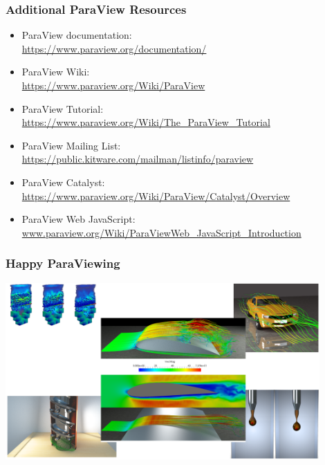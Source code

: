 \begin{frame}

  \frametitle{Additional ParaView Resources}

  \begin{itemize}
      \item ParaView documentation:\\
        \url{https://www.paraview.org/documentation/}
      \item ParaView Wiki:\\
        \url{https://www.paraview.org/Wiki/ParaView}
      \item ParaView Tutorial:\\
        \url{https://www.paraview.org/Wiki/The\_ParaView\_Tutorial}
      \item ParaView Mailing List:\\
        \url{https://public.kitware.com/mailman/listinfo/paraview}
      \item ParaView Catalyst:\\
        \url{https://www.paraview.org/Wiki/ParaView/Catalyst/Overview}
      \item ParaView Web JavaScript:\\
        \url{www.paraview.org/Wiki/ParaViewWeb\_JavaScript\_Introduction}
  \end{itemize}

\end{frame}

\begin{frame}
  \frametitle{Happy ParaViewing}
    \includegraphics[width=0.9\textwidth]{screenshots/paraviewing.png}
\end{frame}

